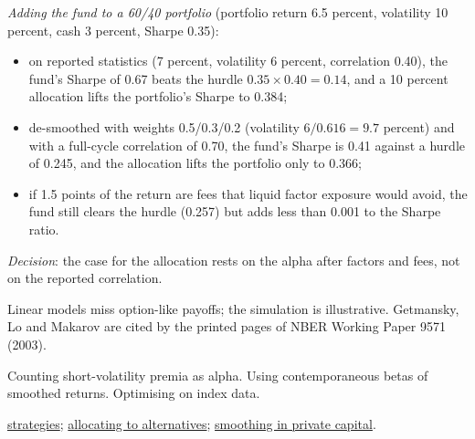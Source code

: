 \begin{qfmethod}
\emph{Adding the fund to a 60/40 portfolio} (portfolio return 6.5 percent, volatility 10 percent, cash 3 percent, Sharpe 0.35):
\begin{itemize}
\item on reported statistics (7 percent, volatility 6 percent, correlation 0.40), the fund's Sharpe of 0.67 beats the hurdle $0.35\times0.40=0.14$, and a 10 percent allocation lifts the portfolio's Sharpe to 0.384;
\item de-smoothed with weights 0.5/0.3/0.2 (volatility $6/0.616=9.7$ percent) and with a full-cycle correlation of 0.70, the fund's Sharpe is 0.41 against a hurdle of 0.245, and the allocation lifts the portfolio only to 0.366;
\item if 1.5 points of the return are fees that liquid factor exposure would avoid, the fund still clears the hurdle (0.257) but adds less than 0.001 to the Sharpe ratio.
\end{itemize}
\emph{Decision}: the case for the allocation rests on the alpha after factors and fees, not on the reported correlation.

 Linear models miss option-like payoffs; the simulation is illustrative. Getmansky, Lo and Makarov are cited by the printed pages of NBER Working Paper 9571 (2003).

 Counting short-volatility premia as alpha. Using contemporaneous betas of smoothed returns. Optimising on index data.

 \hyperref[meth:hedge-fund-strategy-classification]{strategies}; \hyperref[meth:alternatives-allocation-approaches]{allocating to alternatives}; \hyperref[meth:private-capital-diversification]{smoothing in private capital}.

\end{qfmethod}
